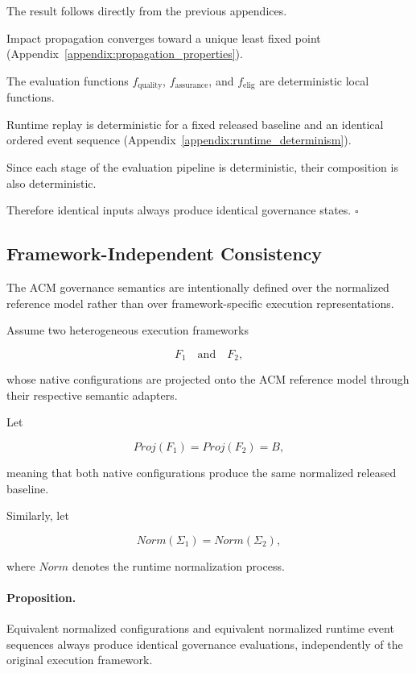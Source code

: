\documentclass[10pt]{article}
\begin{document}
The result follows directly from the previous appendices.

Impact propagation converges toward a unique least fixed point
(Appendix~\ref{appendix:propagation_properties}).

The evaluation functions
$f_{\mathrm{quality}}$,
$f_{\mathrm{assurance}}$,
and
$f_{\mathrm{elig}}$
are deterministic local functions.

Runtime replay is deterministic for a fixed released baseline and an identical
ordered event sequence
(Appendix~\ref{appendix:runtime_determinism}).

Since each stage of the evaluation pipeline is deterministic, their composition
is also deterministic.

Therefore identical inputs always produce identical governance states.
\hfill$\square$

\subsection{Framework-Independent Consistency}
\label{appendix:framework_independent_consistency}

The ACM governance semantics are intentionally defined over the normalized
reference model rather than over framework-specific execution representations.

Assume two heterogeneous execution frameworks

\[
F_1
\quad\text{and}\quad
F_2,
\]

whose native configurations are projected onto the ACM reference model through
their respective semantic adapters.

Let

\[
Proj(F_1)
=
Proj(F_2)
=
B,
\]

meaning that both native configurations produce the same normalized released
baseline.

Similarly, let

\[
Norm(\Sigma_1)
=
Norm(\Sigma_2),
\]

where
$Norm$
denotes the runtime normalization process.

\paragraph*{Proposition.}

Equivalent normalized configurations and equivalent normalized runtime event
sequences always produce identical governance evaluations, independently of the
original execution framework.
\end{document}
